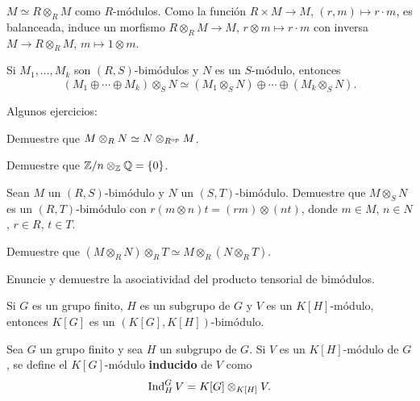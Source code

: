 \begin{example}
$M\simeq R\otimes_R M$ como $R$-módulos. Como la función $R\times M\to M$, $(r,m)\mapsto r\cdot m$, es balanceada, 
induce un morfismo $R\otimes_R M\to M$, $r\otimes m\mapsto r\cdot m$ con inversa $M\to R\otimes_R M$, $m\mapsto 1\otimes m$. 
\end{example}

\begin{example}
Si $M_1,\dots,M_k$ son $(R,S)$-bimódulos y $N$ es un $S$-módulo, entonces
\[
(M_1\oplus\cdots\oplus M_k)\otimes_S N\simeq (M_1\otimes_S N)\oplus\cdots\oplus (M_k\otimes_S N).
\]
\end{example}

Algunos ejercicios:

\begin{exercise}
    Demuestre que $M\otimes_RN\simeq N\otimes_{R^{\operatorname{op}}}M$.
\end{exercise}

\begin{exercise}
    Demuestre que $\mathbb{Z}/n\otimes_{\mathbb{Z}}\mathbb{Q}=\{0\}$.
\end{exercise}

\begin{exercise}
    Sean $M$ un $(R,S)$-bimódulo y $N$ un $(S,T)$-bimódulo. 
    Demuestre que $M\otimes_SN$ es un $(R,T)$-bimódulo 
    con $r(m\otimes n)t=(rm)\otimes (nt)$, 
    donde $m\in M$, $n\in N$, $r\in R$, $t\in T$.
\end{exercise}

\begin{exercise}
    Demuestre que $(M\otimes_R N)\otimes_RT\simeq M\otimes_R (N\otimes_RT)$.
\end{exercise}

\begin{exercise}
    Enuncie y demuestre la asociatividad del producto tensorial de bimódulos. 
\end{exercise}


Si $G$ es un grupo finito, $H$ es un subgrupo de $G$
y $V$ es un $K[H]$-módulo, entonces 
$K[G]$ es un $(K[G],K[H])$-bimódulo.

\begin{definition}
Sea $G$ un grupo finito y sea 
$H$ un subgrupo de $G$. 
Si $V$ es un $K[H]$-módulo de $G$, 
se define el $K[G]$-módulo \textbf{inducido} de $V$ 
como
\[
\operatorname{Ind}_H^GV=K[G]\otimes_{K[H]}V.
\]
\end{definition}


